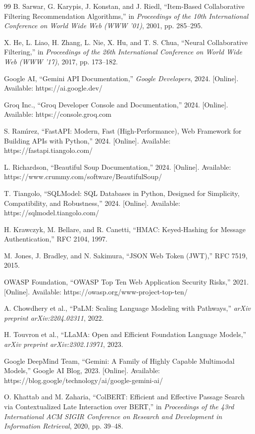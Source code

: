 \documentclass[conference]{IEEEtran}
\begin{document}
\begin{thebibliography}{99}
B. Sarwar, G. Karypis, J. Konstan, and J. Riedl, ``Item-Based Collaborative Filtering Recommendation Algorithms,'' in \textit{Proceedings of the 10th International Conference on World Wide Web (WWW '01)}, 2001, pp. 285--295.

X. He, L. Liao, H. Zhang, L. Nie, X. Hu, and T. S. Chua, ``Neural Collaborative Filtering,'' in \textit{Proceedings of the 26th International Conference on World Wide Web (WWW '17)}, 2017, pp. 173--182.

Google AI, ``Gemini API Documentation,'' \textit{Google Developers}, 2024. [Online]. Available: https://ai.google.dev/

Groq Inc., ``Groq Developer Console and Documentation,'' 2024. [Online]. Available: https://console.groq.com

S. Ram\'\i rez, ``FastAPI: Modern, Fast (High-Performance), Web Framework for Building APIs with Python,'' 2024. [Online]. Available: https://fastapi.tiangolo.com/

L. Richardson, ``Beautiful Soup Documentation,'' 2024. [Online]. Available: https://www.crummy.com/software/BeautifulSoup/

T. Tiangolo, ``SQLModel: SQL Databases in Python, Designed for Simplicity, Compatibility, and Robustness,'' 2024. [Online]. Available: https://sqlmodel.tiangolo.com/

H. Krawczyk, M. Bellare, and R. Canetti, ``HMAC: Keyed-Hashing for Message Authentication,'' RFC 2104, 1997.

M. Jones, J. Bradley, and N. Sakimura, ``JSON Web Token (JWT),'' RFC 7519, 2015.

OWASP Foundation, ``OWASP Top Ten Web Application Security Risks,'' 2021. [Online]. Available: https://owasp.org/www-project-top-ten/

A. Chowdhery et al., ``PaLM: Scaling Language Modeling with Pathways,'' \textit{arXiv preprint arXiv:2204.02311}, 2022.

H. Touvron et al., ``LLaMA: Open and Efficient Foundation Language Models,'' \textit{arXiv preprint arXiv:2302.13971}, 2023.

Google DeepMind Team, ``Gemini: A Family of Highly Capable Multimodal Models,'' Google AI Blog, 2023. [Online]. Available: https://blog.google/technology/ai/google-gemini-ai/

O. Khattab and M. Zaharia, ``ColBERT: Efficient and Effective Passage Search via Contextualized Late Interaction over BERT,'' in \textit{Proceedings of the 43rd International ACM SIGIR Conference on Research and Development in Information Retrieval}, 2020, pp. 39--48.


\end{thebibliography}
\end{document}
